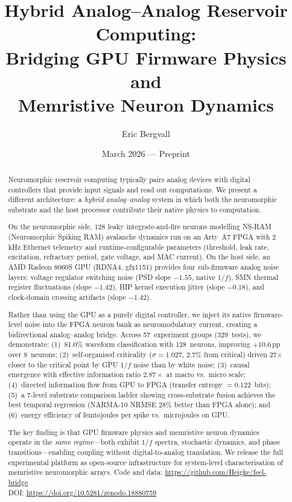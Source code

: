 \documentclass[11pt]{article}
\title{%
  Hybrid Analog--Analog Reservoir Computing:\\
  Bridging GPU Firmware Physics and\\
  Memristive Neuron Dynamics%
}
\author[1]{Eric Bergvall}
\affil[1]{ENIMBLE Solutions AB, Sweden\\ \url{https://www.enimble.se}}
\date{March 2026 --- Preprint}
\begin{document}
\maketitle

\begin{abstract}
Neuromorphic reservoir computing typically pairs analog devices with
digital controllers that provide input signals and read out
computations.  We present a different architecture: a \emph{hybrid
analog--analog} system in which both the neuromorphic substrate and
the host processor contribute their native physics to computation.

On the neuromorphic side, 128 leaky integrate-and-fire neurons
modelling NS-RAM (Neuromorphic Spiking RAM) avalanche dynamics run
on an Arty~A7 FPGA with 2\,kHz Ethernet telemetry and
runtime-configurable parameters (threshold, leak rate, excitation,
refractory period, gate voltage, and MAC current).  On the host
side, an AMD Radeon 8060S GPU (RDNA4, gfx1151) provides four
sub-firmware analog noise layers: voltage regulator switching noise
(PSD slope $-1.55$, native $1/f$), SMN thermal register fluctuations
(slope $-1.42$), HIP kernel execution jitter (slope $-0.18$), and
clock-domain crossing artifacts (slope $-1.42$).

Rather than using the GPU as a purely digital controller, we inject
its native firmware-level noise into the FPGA neuron bank as
neuromodulatory current, creating a bidirectional analog--analog
bridge.  Across 57~experiment groups (329~tests), we demonstrate:
(1)~81.0\% waveform classification with 128~neurons, improving
$+10.6$\,pp over 8~neurons;
(2)~self-organised criticality ($\sigma = 1.027$, 2.7\% from
critical) driven 27$\times$ closer to the critical point by GPU
$1/f$ noise than by white noise;
(3)~causal emergence with effective information ratio $2.87\times$
at macro vs.\ micro scale;
(4)~directed information flow from GPU to FPGA (transfer entropy
$= 0.122$~bits);
(5)~a 7-level substrate comparison ladder showing cross-substrate
fusion achieves the best temporal regression (NARMA-10 NRMSE 28\%
better than FPGA alone);
and (6)~energy efficiency of femtojoules per spike vs.\ microjoules
on GPU.

The key finding is that GPU firmware physics and memristive neuron
dynamics operate in the \emph{same regime}---both exhibit $1/f$
spectra, stochastic dynamics, and phase transitions---enabling
coupling without digital-to-analog translation.  We release the
full experimental platform as open-source infrastructure for
system-level characterisation of memristive neuromorphic arrays.
Code and data: \url{https://github.com/Heigke/feel-bridge} \\
DOI: \url{https://doi.org/10.5281/zenodo.18880759}
\end{abstract}
\end{document}
